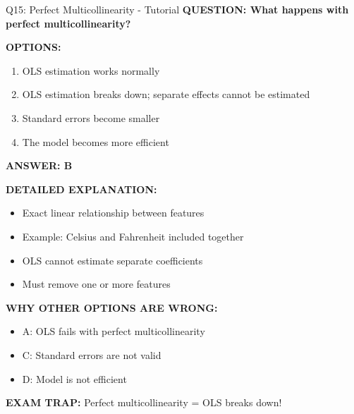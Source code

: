 \documentclass[8pt]{beamer}
\begin{document}
	\begin{frame}{Q15: Perfect Multicollinearity - Tutorial}
		\fontsize{6.5}{7.5}\selectfont
		\textbf{QUESTION: What happens with perfect multicollinearity?}
		
		\vspace{0.1cm}
		\textbf{OPTIONS:}
		\begin{enumerate}
			\item OLS estimation works normally
			\item OLS estimation breaks down; separate effects cannot be estimated
			\item Standard errors become smaller
			\item The model becomes more efficient
		\end{enumerate}
		
		\vspace{0.1cm}
		\textcolor{myblue}{\textbf{ANSWER: B}}
		
		\vspace{0.1cm}
		\textbf{DETAILED EXPLANATION:}
		\begin{itemize}
			\item Exact linear relationship between features
			\item Example: Celsius and Fahrenheit included together
			\item OLS cannot estimate separate coefficients
			\item Must remove one or more features
		\end{itemize}
		
		\vspace{0.1cm}
		\textcolor{myred}{\textbf{WHY OTHER OPTIONS ARE WRONG:}}
		\begin{itemize}
			\item \textcolor{myred}{A:} OLS fails with perfect multicollinearity
			\item \textcolor{myred}{C:} Standard errors are not valid
			\item \textcolor{myred}{D:} Model is not efficient
		\end{itemize}
		
		\textcolor{myred}{\textbf{EXAM TRAP:}} Perfect multicollinearity = \textcolor{myblue}{OLS breaks down}!
	\end{frame}
	
\end{document}
